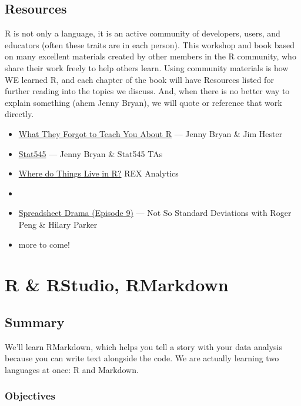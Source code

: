 \documentclass[]{book}
\providecommand{\tightlist}{%
  \setlength{\itemsep}{0pt}\setlength{\parskip}{0pt}}
\begin{document}
\hypertarget{resources}{%
\section{Resources}\label{resources}}

R is not only a language, it is an active community of developers, users, and educators (often these traits are in each person). This workshop and book based on many excellent materials created by other members in the R community, who share their work freely to help others learn. Using community materials is how WE learned R, and each chapter of the book will have Resources listed for further reading into the topics we discuss. And, when there is no better way to explain something (ahem Jenny Bryan), we will quote or reference that work directly.

\begin{itemize}
\tightlist
\item
  \href{https://whattheyforgot.org/}{What They Forgot to Teach You About R} --- Jenny Bryan \& Jim Hester
\item
  \href{https://stat545.com/}{Stat545} --- Jenny Bryan \& Stat545 TAs
\item
  \href{http://rex-analytics.com/things-live-r-r-excel-users/}{Where do Things Live in R?} REX Analytics
\item
  \href{https://blog.shotwell.ca/posts/r_for_excel_users/}{}
\item
  \href{http://nssdeviations.com/episode-9-spreadsheet-drama}{Spreadsheet Drama (Episode 9)} --- Not So Standard Deviations with Roger Peng \& Hilary Parker
\item
  more to come!
\end{itemize}

\hypertarget{rstudio}{%
\chapter{R \& RStudio, RMarkdown}\label{rstudio}}

\hypertarget{summary}{%
\section{Summary}\label{summary}}

We'll learn RMarkdown, which helps you tell a story with your data analysis because you can write text alongside the code. We are actually learning two languages at once: R and Markdown.

\hypertarget{objectives}{%
\subsection{Objectives}\label{objectives}}
\end{document}
